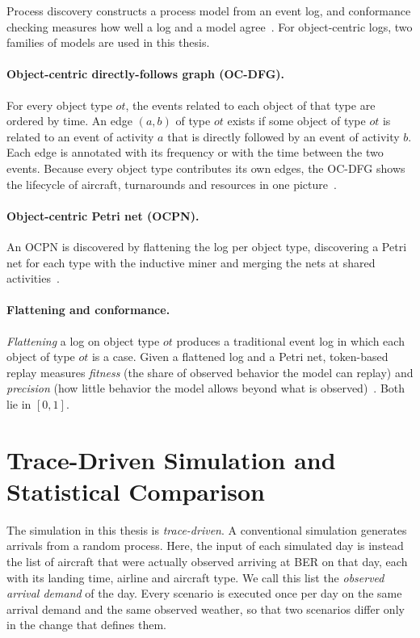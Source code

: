 Process discovery constructs a process model from an event log, and conformance checking measures how well a log and a model agree~\cite{vanderaalst2016pm}. For object-centric logs, two families of models are used in this thesis.

\paragraph{Object-centric directly-follows graph (OC-DFG).}
For every object type $ot$, the events related to each object of that type are ordered by time. An edge $(a,b)$ of type $ot$ exists if some object of type $ot$ is related to an event of activity $a$ that is directly followed by an event of activity $b$. Each edge is annotated with its frequency or with the time between the two events. Because every object type contributes its own edges, the OC-DFG shows the lifecycle of aircraft, turnarounds and resources in one picture~\cite{vanderaalst2020ocpn,berti2023ocpmreview}.

\paragraph{Object-centric Petri net (OCPN).}
An OCPN is discovered by flattening the log per object type, discovering a Petri net for each type with the inductive miner and merging the nets at shared activities~\cite{vanderaalst2020ocpn}.

\paragraph{Flattening and conformance.}
\emph{Flattening} a log on object type $ot$ produces a traditional event log in which each object of type $ot$ is a case. Given a flattened log and a Petri net, token-based replay measures \emph{fitness} (the share of observed behavior the model can replay) and \emph{precision} (how little behavior the model allows beyond what is observed)~\cite{rozinat2008conformance}. Both lie in $[0,1]$.

\section{Trace-Driven Simulation and Statistical Comparison}
\label{sec:prelim-stats}

The simulation in this thesis is \emph{trace-driven}. A conventional simulation generates arrivals from a random process. Here, the input of each simulated day is instead the list of aircraft that were actually observed arriving at BER on that day, each with its landing time, airline and aircraft type. We call this list the \emph{observed arrival demand} of the day. Every scenario is executed once per day on the same arrival demand and the same observed weather, so that two scenarios differ only in the change that defines them.

